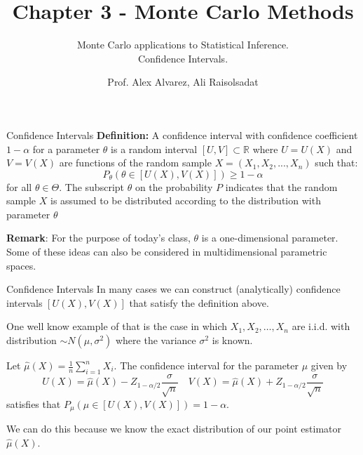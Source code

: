 \documentclass[8pt]{beamer}
\title{Chapter 3 - Monte Carlo Methods}
\subtitle{Monte Carlo applications to Statistical Inference. \\ Confidence Intervals.}
\author{Prof. Alex Alvarez, Ali Raisolsadat}
\institute{School of Mathematical and Computational Sciences \\ University of Prince Edward Island}
\date{} %
\begin{document}
\maketitle

\begin{frame}{Confidence Intervals}
\textbf{Definition:} A confidence interval with confidence coefficient $1-\alpha$ for a parameter $\theta$ is a random interval $[U,V] \subset \mathbb{R}$ where $U=U(X)$ and $V=V(X)$ are functions of the random sample $X=(X_1,X_2,...,X_n)$ such that:
\begin{equation*}
P_{\theta}\left(\theta \in [U(X),V(X)]\right) \geq 1-\alpha
\end{equation*}
for all $\theta \in \Theta$. The subscript $\theta$ on the probability $P$ indicates that the random sample $X$ is assumed to be distributed according to the distribution with parameter $\theta$

\vspace{3mm}

\textbf{Remark}: For the purpose of today's class, $\theta$ is a one-dimensional parameter. Some of these ideas can also be considered in multidimensional parametric spaces.
\end{frame}

\begin{frame}{Confidence Intervals}
In many cases we can construct (analytically) confidence intervals $[U(X),V(X)]$ that satisfy the definition above.

\vspace{3mm}

One well know example of that is the case in which $X_1,X_2,\ldots,X_n $ are i.i.d. with distribution $\sim N(\mu, \sigma^2)$ where the variance $\sigma^2$ is known.

\vspace{3mm}

Let $\displaystyle{\hat{\mu}(X)=\frac{1}{n}\sum_{i=1}^{n}X_i}$. The confidence interval for the parameter $\mu$ given by
\vspace{3mm}
\begin{equation*}
U(X)=\hat{\mu}(X)-Z_{1-\alpha/2} \frac{ \sigma}{\sqrt{n}} \quad V(X)=\hat{\mu}(X)+Z_{1-\alpha/2} \frac{ \sigma}{\sqrt{n}}
\end{equation*}
satisfies that $P_\mu( \mu \in [U(X),V(X)])=1-\alpha$.

\vspace{3mm} 

We can do this because we know the exact distribution of our point estimator $\hat{\mu}(X)$.
\end{frame}
\end{document}
